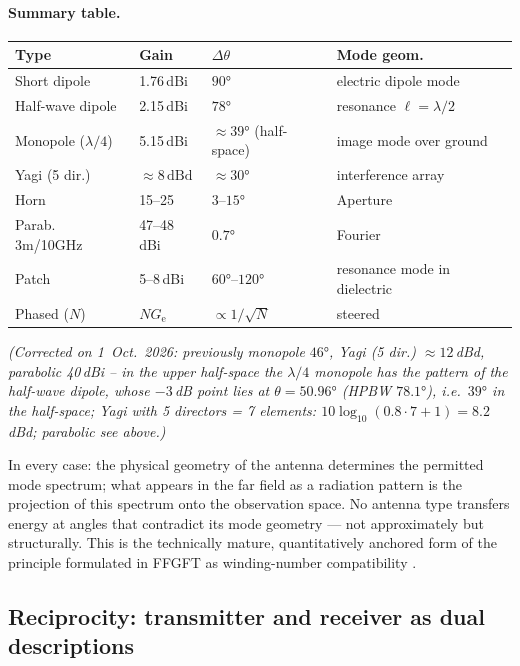 \paragraph{Summary table.}

{\setlength{\hfuzz}{8pt}%
\begin{center}
\begin{tabular}{@{}lp{1.5cm}p{1.6cm}p{2.1cm}@{}}
\toprule
\textbf{Type} & \textbf{Gain} & \textbf{$\Delta\theta$}
             & \textbf{Mode geom.} \\
\midrule
Short dipole     & 1.76\,dBi  & $90°$         & electric dipole mode \\
Half-wave dipole & 2.15\,dBi & $78°$          & resonance $\ell=\lambda/2$ \\
Monopole ($\lambda/4$) & 5.15\,dBi & ${\approx}39°$ (half-space) & image mode over ground \\
Yagi (5 dir.)   & ${\approx}8\,\mathrm{dBd}$ & ${\approx}30°$ & interference array \\
Horn & 15--25 & $3$--$15°$ & Aperture\\
Parab. 3m/10GHz & 47--48\,dBi & $0.7°$ & Fourier \\
Patch           & 5--8\,dBi  & $60°$--$120°$ & resonance mode in dielectric \\
Phased ($N$) & $N G_\mathrm{e}$ & $\propto 1/\sqrt{N}$ & steered \\
\bottomrule
\end{tabular}
\end{center}}%
\textit{(Corrected on 1~Oct.~2026: previously monopole $46°$, Yagi (5 dir.) ${\approx}12$\,dBd, parabolic 40\,dBi -- in the upper half-space the $\lambda/4$ monopole has the pattern of the half-wave dipole, whose $-3$\,dB point lies at $\theta = 50.96°$ (HPBW $78.1°$), i.e.\ $39°$ in the half-space; Yagi with 5 directors = 7 elements: $10\log_{10}(0.8\cdot7+1) = 8.2$\,dBd; parabolic see above.)}

In every case: the physical geometry of the antenna determines the permitted
mode spectrum; what appears in the far field as a radiation pattern is the
projection of this spectrum onto the observation space. No antenna type
transfers energy at angles that contradict its mode geometry --- not
approximately but structurally. This is the technically mature, quantitatively
anchored form of the principle formulated in FFGFT as winding-number
compatibility \SM.

\subsection*{Reciprocity: transmitter and receiver as dual descriptions}

